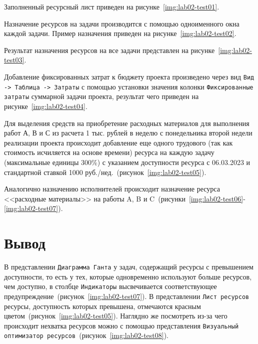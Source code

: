 Заполненный ресурсный лист приведен на рисунке~\ref{img:lab02-test01}.


Назначение ресурсов на задачи производится с помощью одноименного окна каждой
задачи. Пример назначения приведен на рисунке~\ref{img:lab02-test02}.


Результат назначения ресурсов на все задачи представлен на
рисунке~\ref{img:lab02-test03}.


Добавление фиксированных затрат к бюджету проекта произведено через вид
\texttt{Вид -> Таблица -> Затраты} с помощью установки значения колонки
\texttt{Фиксированные затраты} суммарной задачи проекта, результат чего
приведен на рисунке~\ref{img:lab02-test04}.


Для выделения средств на приобретение расходных материалов для выполнения работ
А, В и С из расчета 1 тыс. рублей в неделю с понедельника второй недели
реализации проекта происходит добавление еще одного трудового (так как
стоимость исчиляется на основе времени) ресурса на каждую задачу (максимальные
единицы 300\%) с указанием доступности ресурса с 06.03.2023 и стандартной
ставкой 1000 руб./нед.~(рисунок~\ref{img:lab02-test05}).


Аналогично назначению исполнителей происходит назначение ресурса <<расходные
материалы>> на работы A, B и
C~(рисунки~\ref{img:lab02-test06}-\ref{img:lab02-test07}).



\section*{Вывод}

В представлении \texttt{Диаграмма Ганта} у задач, содержащий ресурсы с
превышением доступности, то есть у тех, которые одновременно используют больше
ресурсов, чем доступно, в столбце \texttt{Индикаторы} высвечивается
соответствующее предупреждение~(рисунок~\ref{img:lab02-test07}). В представлении
\texttt{Лист ресурсов} ресурсы, доступность которых превышена, отмечаются
красным цветом~(рисунок~\ref{img:lab02-test05}). Наглядно же посмотреть из-за
чего происходит нехватка ресурсов можно с помощью представления
\texttt{Визуальный оптимизатор ресурсов}~(рисунок~\ref{img:lab02-test08}). 

